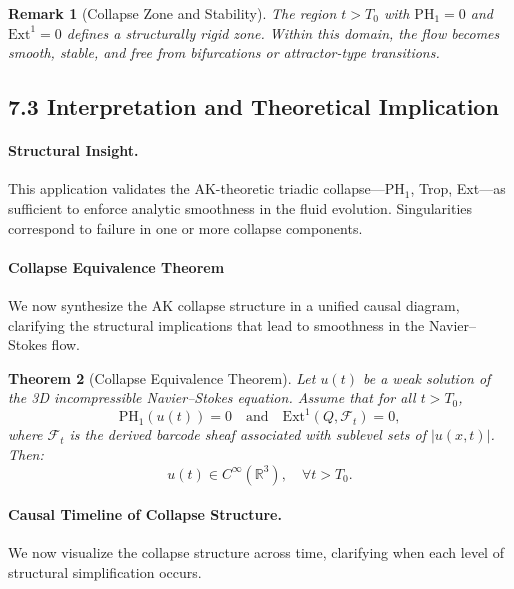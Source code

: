 \documentclass[11pt]{article}
\newtheorem{theorem}{Theorem}[section]
\newtheorem{remark}[theorem]{Remark}
\begin{document}
\begin{remark}[Collapse Zone and Stability]
The region $t > T_0$ with $\mathrm{PH}_1 = 0$ and $\mathrm{Ext}^1 = 0$ defines a structurally rigid zone.  
Within this domain, the flow becomes smooth, stable, and free from bifurcations or attractor-type transitions.
\end{remark}

\subsection{7.3 Interpretation and Theoretical Implication}

\paragraph{Structural Insight.}
This application validates the AK-theoretic triadic collapse—PH$_1$, Trop, Ext—as sufficient to enforce analytic smoothness in the fluid evolution. Singularities correspond to failure in one or more collapse components.

\paragraph{Collapse Equivalence Theorem}
We now synthesize the AK collapse structure in a unified causal diagram,  
clarifying the structural implications that lead to smoothness in the Navier--Stokes flow.

\begin{theorem}[Collapse Equivalence Theorem]
Let \( u(t) \) be a weak solution of the 3D incompressible Navier–Stokes equation.  
Assume that for all \( t > T_0 \),
\[
\mathrm{PH}_1(u(t)) = 0 \quad \text{and} \quad \mathrm{Ext}^1(Q, \mathcal{F}_t) = 0,
\]
where \( \mathcal{F}_t \) is the derived barcode sheaf associated with sublevel sets of \( |u(x,t)| \).  
Then:
\[
u(t) \in C^\infty(\mathbb{R}^3), \quad \forall t > T_0.
\]
\end{theorem}

\paragraph{Causal Timeline of Collapse Structure.}
We now visualize the collapse structure across time, clarifying when each level of structural simplification occurs.

\begin{center}
\end{center}
\end{document}
